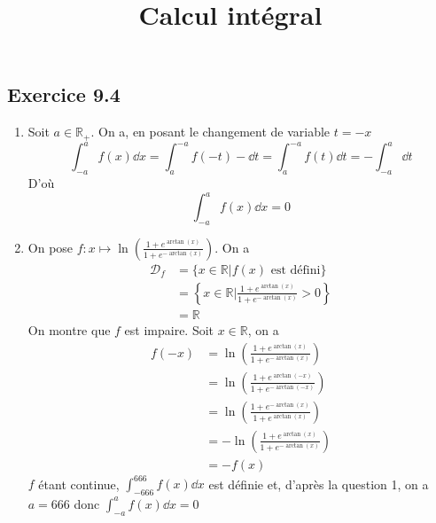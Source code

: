 \documentclass[7pt, twocolumn]{extarticle}
\title{\textbf{Calcul intégral}}
\date{}
\def\R{\mathbb R}
\begin{document}
  \subsection*{Exercice 9.4}
  \begin{enumerate}
    \item Soit $a\in \R_+$. On a, en posant le changement de variable $t=-x$ \[\int_{-a}^af(x)\dd x=\int_a^{-a}f(-t)-\dd t=\int_a^{-a}f(t)\dd t=-\int_{-a}^a\dd t\]
    D'où \[\int_{-a}^af(x)\dd x = 0\]
    \item On pose $f:x\mapsto \ln\left(\frac{1+e^{\arctan(x)}}{1+e^{-\arctan(x)}}\right)$. On a 
    \begin{align*}
      \mathcal{D}_f &= \lbrace x\in\R | f(x) \text{ est défini} \rbrace\\
                    &= \left\lbrace x\in\R | \frac{1+e^{\arctan(x)}}{1+e^{-\arctan(x)}} > 0 \right\rbrace\\
                    &= \R
    \end{align*}
    On montre que $f$ est impaire. Soit $x\in\R$, on a
    \begin{align*}
      f(-x) &= \ln\left(\frac{1+e^{\arctan(x)}}{1+e^{-\arctan(x)}}\right) \\
            &= \ln\left(\frac{1+e^{\arctan(-x)}}{1+e^{-\arctan(-x)}}\right) \\ 
            &= \ln\left(\frac{1+e^{-\arctan(x)}}{1+e^{\arctan(x)}}\right) \\
            &= -\ln\left(\frac{1+e^{\arctan(x)}}{1+e^{-\arctan(x)}}\right) \\
            &= -f(x)
    \end{align*}
    $f$ étant continue, $\int_{-666}^{666}f(x)\dd x$ est définie et, d'après la question 1, on a $a=666$ donc $\int_{-a}^af(x)\dd x = 0$
  \end{enumerate}
\end{document}
